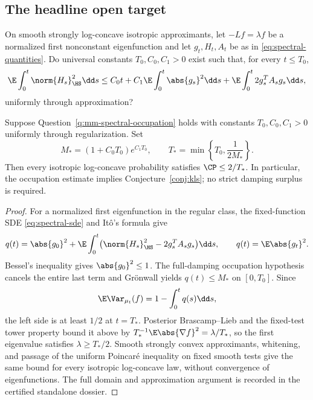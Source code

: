 \documentclass[../../main.tex]{subfiles}
\begin{document}
\subsection{The headline open target}
\label{subsec:spectral-headline}

\begin{question}
\label{q:mm-spectral-occupation}
On smooth strongly log-concave isotropic approximants, let $-Lf=\lambda f$ be a normalized first
nonconstant eigenfunction and let $g_t,H_t,A_t$ be as in \eqref{eq:spectral-quantities}. Do
universal constants $T_0,C_0,C_1>0$ exist such that, for every $t\le T_0$,
\begin{equation}
  \E\int_0^t\norm{H_s}_{\HS}^2\dd s
  \le C_0t+C_1\E\int_0^t\abs{g_s}^2\dd s
  +\E\int_0^t2g_s^TA_sg_s\dd s,
  \label{eq:spectral-occupation}
\end{equation}
uniformly through approximation?
\end{question}

\begin{proposition}
\label{prop:spectral-sufficiency}
Suppose Question~\ref{q:mm-spectral-occupation} holds with constants $T_0,C_0,C_1>0$ uniformly
through regularization.  Set
\[
  M_*=(1+C_0T_0)e^{C_1T_0},
  \qquad
  T_* = \min\left\{T_0,\frac1{2M_*}\right\}.
\]
Then every isotropic log-concave probability satisfies
$\CP\le2/T_*$.  In particular, the occupation estimate implies
Conjecture~\ref{conj:kls}; no strict damping surplus is required.
\end{proposition}

\begin{proof}
For a normalized first eigenfunction in the regular class, the fixed-function SDE
\eqref{eq:spectral-sde} and It\^o's formula give
\[
  q(t)=\abs{g_0}^2+
  \E\int_0^t\bigl(\norm{H_s}_{\HS}^2-2g_s^TA_sg_s\bigr)\dd s,
  \qquad q(t)=\E\abs{g_t}^2.
\]
Bessel's inequality gives $\abs{g_0}^2\le1$.  The full-damping occupation hypothesis cancels
the entire last term and Gr\"onwall yields $q(t)\le M_*$ on $[0,T_0]$.  Since
\[
  \E\Var_{\mu_t}(f)=1-\int_0^tq(s)\dd s,
\]
the left side is at least $1/2$ at $t=T_*$.  Posterior Brascamp--Lieb and the fixed-test tower
property bound it above by
$T_*^{-1}\E\abs{\nabla f}^2=\lambda/T_*$, so the first eigenvalue satisfies
$\lambda\ge T_*/2$.  Smooth strongly convex approximants, whitening, and passage of the
uniform Poincar\'e inequality on fixed smooth tests give the same bound for every isotropic
log-concave law, without convergence of eigenfunctions.  The full domain and approximation
argument is recorded in the certified standalone dossier.
\end{proof}
\end{document}
